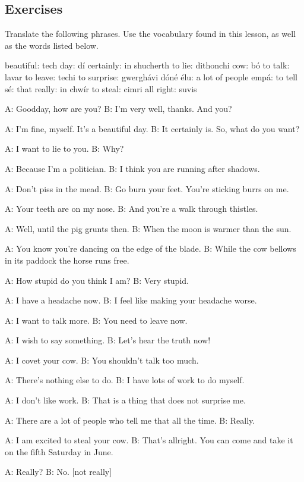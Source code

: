 \subsection{Exercises}

Translate the following phrases. Use the vocabulary found in this lesson, as well as the words listed below.

beautiful: tech
day: d\'{i}
certainly: in shucherth
to lie: dithonchi
cow: b\'{o}
to talk: lavar
to leave: techi
to surprise: gwergh\'{a}vi
d\'{o}n\'{e} \'{e}lu: a lot of people
emp\'{a}: to tell
s\'{e}: that
really: in chw\'{i}r
to steal: cimri
all right: suvis

A: Goodday, how are you?
B: I'm very well, thanks. And you?

A: I'm fine, myself. It's a beautiful day.
B: It certainly is. So, what do you want?

A: I want to lie to you.
B: Why?

A: Because I'm a politician.
B: I think you are running after shadows.

A: Don't piss in the mead.
B: Go burn your feet. You're sticking burrs on me.

A: Your teeth are on my nose.
B: And you're a walk through thistles.

A: Well, until the pig grunts then.
B: When the moon is warmer than the sun.

A: You know you're dancing on the edge of the blade.
B: While the cow bellows in its paddock the horse runs free.

A: How stupid do you think I am?
B: Very stupid.

A: I have a headache now.
B: I feel like making your headache worse.

A: I want to talk more.
B: You need to leave now.

A: I wish to say something.
B: Let's hear the truth now!

A: I covet your cow.
B: You shouldn't talk too much.

A: There's nothing else to do.
B: I have lots of work to do myself.

A: I don't like work.
B: That is a thing that does not surprise me.

A: There are a lot of people who tell me that all the time.
B: Really.

A: I am excited to steal your cow.
B: That's allright. You can come and take it on the fifth Saturday in June.

A: Really?
B: No. [not really]

